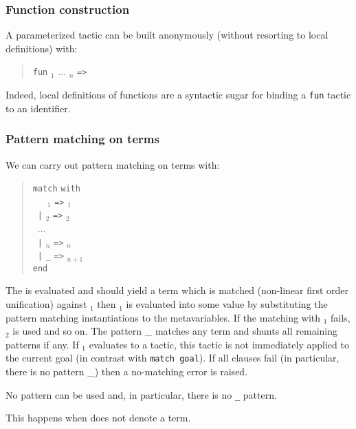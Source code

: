 
\subsubsection{Function construction}

A parameterized tactic can be built anonymously (without resorting to
local definitions) with:
\begin{quote}
{\tt fun} {\ident${}_1$} ... {\ident${}_n$} {\tt =>} {\tacexpr}
\end{quote}
Indeed, local definitions of functions are a syntactic sugar for
binding a {\tt fun} tactic to an identifier.

\subsubsection{Pattern matching on terms}

We can carry out pattern matching on terms with:
\begin{quote}
{\tt match} {\tacexpr} {\tt with}\\
~~~{\cpattern}$_1$ {\tt =>} {\tacexpr}$_1$\\
~{\tt |} {\cpattern}$_2$ {\tt =>} {\tacexpr}$_2$\\
~...\\
~{\tt |} {\cpattern}$_n$ {\tt =>} {\tacexpr}$_n$\\
~{\tt |} {\tt \_} {\tt =>} {\tacexpr}$_{n+1}$\\
{\tt end}
\end{quote}
The {\tacexpr} is evaluated and should yield a term which is matched
(non-linear first order unification) against {\cpattern}$_1$ then
{\tacexpr}$_1$ is evaluated into some value by substituting the
pattern matching instantiations to the metavariables. If the matching
with {\cpattern}$_1$ fails, {\cpattern}$_2$ is used and so on.  The
pattern {\_} matches any term and shunts all remaining patterns if
any. If {\tacexpr}$_1$ evaluates to a tactic, this tactic is not
immediately applied to the current goal (in contrast with {\tt match
goal}). If all clauses fail (in particular, there is no pattern {\_})
then a no-matching error is raised.

\begin{ErrMsgs}

\item {}

  No pattern can be used and, in particular, there is no {\tt \_} pattern.

\item {}

  This happens when {\tacexpr} does not denote a term.

\end{ErrMsgs}

